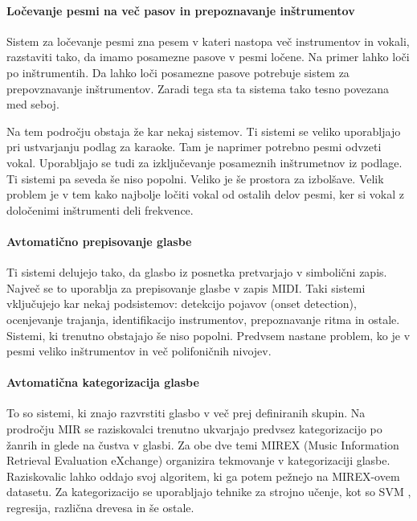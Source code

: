 \documentclass[a4paper, 12pt]{book}
\begin{document}
{\paragraph{Ločevanje pesmi na več pasov in prepoznavanje inštrumentov}

Sistem za ločevanje pesmi zna pesem v kateri nastopa več instrumentov in vokali, razstaviti tako, da imamo posamezne pasove v pesmi ločene. Na primer lahko loči po inštrumentih. Da lahko loči posamezne pasove potrebuje sistem za prepovznavanje inštrumentov. Zaradi tega sta ta sistema tako tesno povezana med seboj. 

Na tem področju obstaja že kar nekaj sistemov. Ti sistemi se veliko uporabljajo pri ustvarjanju podlag za karaoke. Tam je naprimer potrebno pesmi odvzeti vokal. Uporabljajo se tudi za izključevanje posameznih inštrumetnov iz podlage. Ti sistemi pa seveda še niso popolni. Veliko je še prostora za izbolšave. Velik problem je v tem kako najbolje ločiti vokal od ostalih delov pesmi, ker si vokal z določenimi inštrumenti deli frekvence.

\paragraph{Avtomatično prepisovanje glasbe}

Ti sistemi delujejo tako, da glasbo iz posnetka pretvarjajo v simbolični zapis. Največ se to uporablja za prepisovanje glasbe v zapis MIDI. Taki sistemi vključujejo kar nekaj podsistemov: detekcijo pojavov (onset detection), ocenjevanje trajanja, identifikacijo instrumentov, prepoznavanje ritma in ostale. Sistemi, ki trenutno obstajajo še niso popolni. Predvsem nastane problem, ko je v pesmi veliko inštrumentov in več polifoničnih nivojev. 

\paragraph{Avtomatična kategorizacija glasbe}

To so sistemi, ki znajo razvrstiti glasbo v več prej definiranih skupin. Na prodročju MIR se raziskovalci trenutno ukvarjajo predvsez kategorizacijo po žanrih in glede na čustva v glasbi. Za obe dve temi MIREX (Music Information Retrieval Evaluation eXchange) organizira tekmovanje v kategorizaciji glasbe. Raziskovalic lahko oddajo svoj algoritem, ki ga potem pežnejo na MIREX-ovem datasetu. Za kategorizacijo se uporabljajo tehnike za strojno učenje, kot so SVM \cite{ben2010user}, regresija, različna drevesa in še ostale.

}
\end{document}
